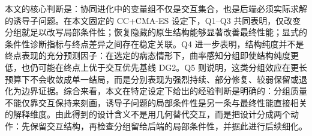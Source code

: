 本文的核心判断是：协同进化中的变量组不仅是交互集合，也是后端必须实际求解的诱导子问题。在本文固定的 CC+CMA-ES 设定下，Q1--Q3 共同表明，仅改变分组就足以改写局部条件性；恢复隐藏的原生结构能够显著改善最终性能；显式的条件性诊断指标与终点差异之间存在稳定关联。Q4 进一步表明，结构纯度并不是终点表现的充分预测因子：在选定的病态情形下，曲率感知分组即使结构纯度更低，也仍可能在终点上优于交互优先基线 DG2。Q5 则说明，这类分组效应在更长预算下不会收敛成单一结局，而是分别表现为强烈持续、部分修复、较弱保留或退化为边界证据。综合来看，本文在特定设定下给出的经验判断是明确的：分组质量不能仅靠交互保持来刻画，诱导子问题的局部条件性是另一条与最终性能直接相关的解释维度。由此得到的设计含义不是用几何替代交互，而是把设计分成两个动作：先保留交互结构，再检查分组留给后端的局部条件性，并据此进行后续细化。

